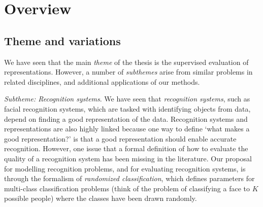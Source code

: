 \section{Overview}

\subsection{Theme and variations}

We have seen that the main \emph{theme} of the thesis is the
supervised evaluation of representations.  However, a number
of \emph{subthemes} arise from similar problems in related
disciplines, and additional applications of our methods.

\emph{Subtheme: Recognition systems}.  We have seen that
\emph{recognition systems}, such as facial recognition systems, which
are tasked with identifying objects from data, depend on finding a
good representation of the data.  Recognition systems and
representations are also highly linked because one way to define `what
makes a good representation?' is that a good representation should
enable accurate recognition.  However, one issue that a formal
definition of how to evaluate the quality of a recognition system has
been missing in the literature.  Our proposal for modelling
recognition problems, and for evaluating recognition systems, is
through the formalism of \emph{randomized classification}, which
defines parameters for multi-class classification problems (think of
the problem of classifying a face to $K$ possible people) where the
classes have been drawn randomly.

